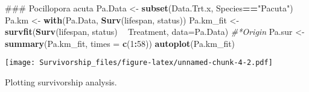 \documentclass[]{article}
\newenvironment{Shaded}{\begin{snugshade}}{\end{snugshade}}
\newcommand{\KeywordTok}[1]{\textcolor[rgb]{0.13,0.29,0.53}{\textbf{#1}}}
\newcommand{\DataTypeTok}[1]{\textcolor[rgb]{0.13,0.29,0.53}{#1}}
\newcommand{\DecValTok}[1]{\textcolor[rgb]{0.00,0.00,0.81}{#1}}
\newcommand{\StringTok}[1]{\textcolor[rgb]{0.31,0.60,0.02}{#1}}
\newcommand{\CommentTok}[1]{\textcolor[rgb]{0.56,0.35,0.01}{\textit{#1}}}
\newcommand{\OperatorTok}[1]{\textcolor[rgb]{0.81,0.36,0.00}{\textbf{#1}}}
\newcommand{\NormalTok}[1]{#1}
\begin{document}
\begin{Shaded}
\begin{Highlighting}[]
\NormalTok{### Pocillopora acuta}
\NormalTok{Pa.Data <-}\StringTok{ }\KeywordTok{subset}\NormalTok{(Data.Trt.x, Species}\OperatorTok{==}\StringTok{"Pacuta"}\NormalTok{)}
\NormalTok{Pa.km <-}\StringTok{ }\KeywordTok{with}\NormalTok{(Pa.Data, }\KeywordTok{Surv}\NormalTok{(lifespan, status))}
\NormalTok{Pa.km_fit <-}\StringTok{ }\KeywordTok{survfit}\NormalTok{(}\KeywordTok{Surv}\NormalTok{(lifespan, status) }\OperatorTok{~}\StringTok{ }\NormalTok{Treatment, }\DataTypeTok{data=}\NormalTok{Pa.Data) }\CommentTok{#*Origin}
\NormalTok{Pa.sur <-}\StringTok{ }\KeywordTok{summary}\NormalTok{(Pa.km_fit, }\DataTypeTok{times =} \KeywordTok{c}\NormalTok{(}\DecValTok{1}\OperatorTok{:}\DecValTok{58}\NormalTok{))}
\KeywordTok{autoplot}\NormalTok{(Pa.km_fit)}
\end{Highlighting}
\end{Shaded}

\texttt{[image: Survivorship\_files/figure-latex/unnamed-chunk-4-2.pdf]}

Plotting survivorship analysis.
\end{document}
